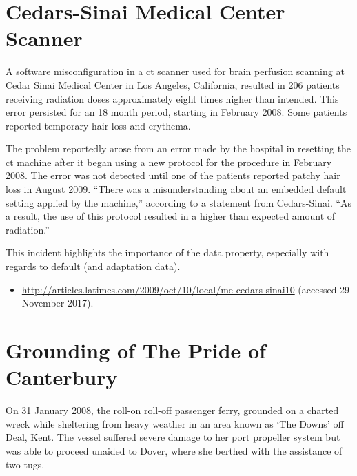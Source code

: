 \section{\protect Cedars-Sinai Medical Center\protect{} Scanner} \label{bkm:incacc:cedarssinai}
A software misconfiguration in a \gls{ct} scanner used for brain perfusion scanning at Cedar Sinai Medical Center in Los Angeles, California, resulted in 206 patients receiving radiation doses approximately eight times higher than intended. This error persisted for an 18 month period, starting in February 2008. Some patients reported temporary hair loss and erythema. 

The problem reportedly arose from an error made by the hospital in resetting the \gls{ct} machine after it began using a new protocol for the procedure in February 2008. The error was not detected until one of the patients reported patchy hair loss in August 2009. ``There was a misunderstanding about an embedded default setting applied by the machine,'' according to a statement from Cedars-Sinai. ``As a result, the use of this protocol resulted in a higher than expected amount of radiation.'' 

This incident highlights the importance of the  \gls{data property}, especially with regards to default (and \gls{adaptation data}).

\begin{samepage}
\begin{itemize}
  \item \raggedright{\href{http://articles.latimes.com/2009/oct/10/local/me-cedars-sinai10}{http://articles.latimes.com/2009/oct/10/local/me-cedars-sinai10} (accessed 29 November 2017).}
\end{itemize}
\end{samepage}


\section{Grounding of The Pride of Canterbury} \label{bkm:incacc:canterbury}
On 31 January 2008, the roll-on roll-off passenger ferry,  grounded on a charted wreck while sheltering from heavy weather in an area known as `The Downs' off Deal, Kent. The vessel suffered severe damage to her port propeller system but was able to proceed unaided to Dover, where she berthed with the assistance of two tugs.

